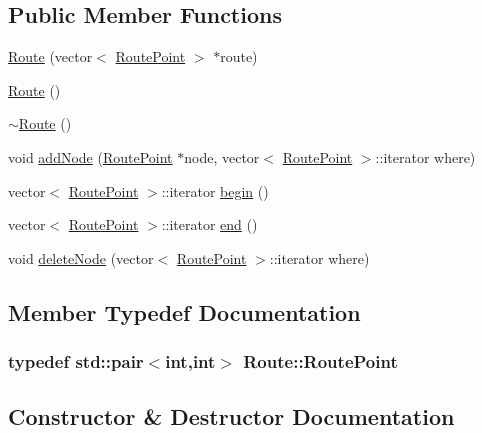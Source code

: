 \subsection*{Public Member Functions}
\begin{DoxyCompactItemize}
\item 
\hyperlink{class_route_a1ec08c9fc58390b1b135aabb0eb1624a}{Route} (vector$<$ \hyperlink{class_route_a9db7fc1029ed57a38dc7bb0921f82946}{Route\+Point} $>$ $\ast$route)
\item 
\hyperlink{class_route_a2b1c971aaf032109cee8081c97e9b9e9}{Route} ()
\item 
\hyperlink{class_route_a41212532f2bce3298d8f9468f82c62ab}{$\sim$\+Route} ()
\item 
void \hyperlink{class_route_aa67a2eac11b2d49ae81ec5a50c80c7a8}{add\+Node} (\hyperlink{class_route_a9db7fc1029ed57a38dc7bb0921f82946}{Route\+Point} $\ast$node, vector$<$ \hyperlink{class_route_a9db7fc1029ed57a38dc7bb0921f82946}{Route\+Point} $>$\+::iterator where)
\item 
vector$<$ \hyperlink{class_route_a9db7fc1029ed57a38dc7bb0921f82946}{Route\+Point} $>$\+::iterator \hyperlink{class_route_a5cbb29c06b365a9cb73c3a3afe4deff4}{begin} ()
\item 
vector$<$ \hyperlink{class_route_a9db7fc1029ed57a38dc7bb0921f82946}{Route\+Point} $>$\+::iterator \hyperlink{class_route_afd80ce5371e7457f278b9c0fd0de79a9}{end} ()
\item 
void \hyperlink{class_route_afa0af81871dbd84a1208d4b74ce77dc3}{delete\+Node} (vector$<$ \hyperlink{class_route_a9db7fc1029ed57a38dc7bb0921f82946}{Route\+Point} $>$\+::iterator where)
\end{DoxyCompactItemize}


\subsection{Member Typedef Documentation}
\hypertarget{class_route_a9db7fc1029ed57a38dc7bb0921f82946}{}
\subsubsection[{Route\+Point}]{\setlength{\rightskip}{0pt plus 5cm}typedef std\+::pair$<$int,int$>$ {\bf Route\+::\+Route\+Point}}\label{class_route_a9db7fc1029ed57a38dc7bb0921f82946}


\subsection{Constructor \& Destructor Documentation}
\hypertarget{class_route_a1ec08c9fc58390b1b135aabb0eb1624a}{}
